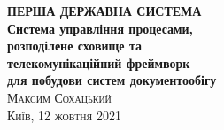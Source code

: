 \frontmatter
\thispagestyle{empty}
\mbox{}\vspace{1in}
\noindent
\begin{flushright}
\vspace{0.5cm}
\textbf{\Huge ПЕРША ДЕРЖАВНА СИСТЕМА} \\
\vspace{0.5cm}
\textbf{\huge Система управління процесами, \\
        \huge розподілене сховище та \\
        \huge телекомунікаційний фреймворк \\
        \huge для побудови систем документообігу \\
}
\vspace{1em}
\vspace{6cm}
\hfill{\Large\scshape{}Максим Сохацький}
\\
\vspace{0.3cm}
\hfill{\scshape{}Київ, 12 жовтня 2021}
\end{flushright}
\cleartorecto
\tableofcontents*
\mainmatter
